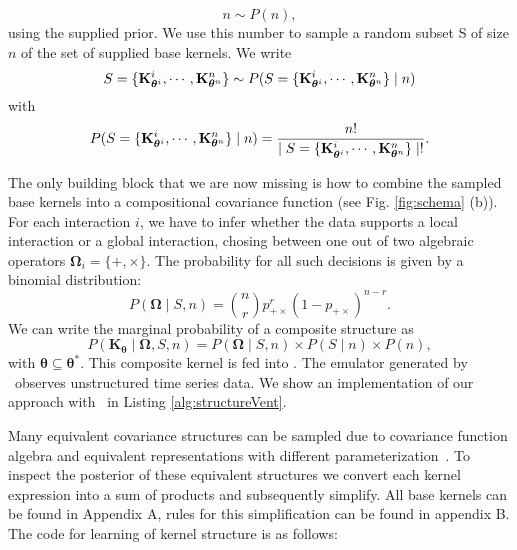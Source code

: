 \[
n \sim P(n),
\]
using the supplied prior. We use this number to sample a random subset S of size $n$ of
the set of supplied base kernels. We write
\[
S = \{\mathbf{K}_{\bm{\theta}^i}^i,\cdots,\mathbf{K}_{\bm{\theta}^n}^n\}
\sim P(S = \{\mathbf{K}_{\bm{\theta}^i}^i,\cdots,\mathbf{K}_{\bm{\theta}^n}^n\} \mid n) 
\]
with
\[
P(S = \{\mathbf{K}_{\bm{\theta}^i}^i,\cdots,\mathbf{K}_{\bm{\theta}^n}^n\}\mid n) = \frac{n!}{ \mid S = \{\mathbf{K}_{\bm{\theta}^i}^i,\cdots,\mathbf{K}_{\bm{\theta}^n}^n\}\mid !}.
\]

The only building block that we are now missing is how to combine the sampled
base kernels into a compositional covariance function (see Fig. \ref{fig:schema}
(b)). For each interaction $i$, we
have to infer whether the data supports a local interaction or a global interaction,
chosing between one out of two algebraic operators
$\bm{\Omega}_i=\{+,\times\}$. The probability for all such decisions is given by a binomial distribution: 
\begin{equation}
P(\bm{\Omega} \mid S,n)= {n \choose r}  p_{+\times}^r (1 - p_{+\times})^{n-r}.
\end{equation}
We can write the marginal probability of a composite structure as
\begin{equation}
P(\mathbf{K}_{\bm{\theta}} \mid \bm{\Omega},S,n) = P(\bm{\Omega} \mid S,n)\times P(S \mid n) \times P(n),
\end{equation}
with $\bm{\theta}\subseteq \bm{\theta}^*$. This  composite kernel is fed into \gpmem. 
The emulator generated by \gpmem\ observes unstructured time series data. We
show an implementation of our approach with \gpmem\ in Listing
\ref{alg:structureVent}. 








Many equivalent covariance structures can be sampled due to covariance function algebra
and equivalent representations with different parameterization~\citep{lloyd2014automatic}.
To inspect the posterior of these equivalent structures we convert each kernel expression
into a sum of products and subsequently simplify. All base kernels can be found in Appendix A,
rules for this simplification can be found in appendix B. The code for learning of kernel structure 
is as follows:


